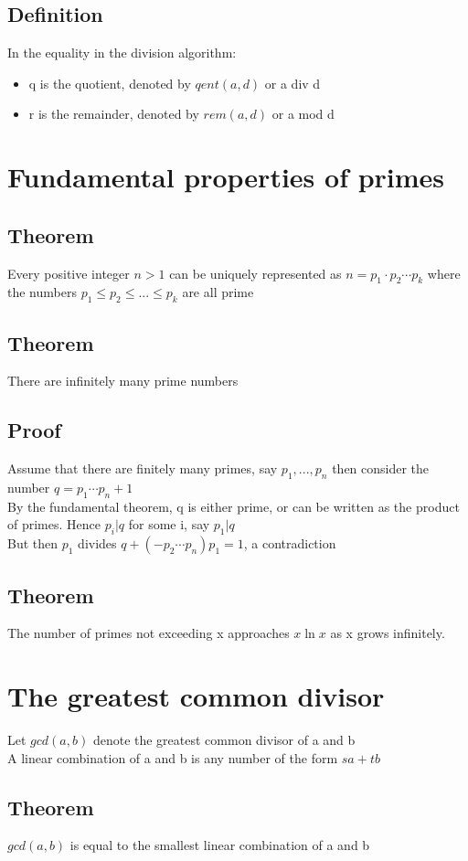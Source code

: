 \documentclass{article}[18pt]
\begin{document}
\subsection{Definition}
In the equality in the division algorithm:
\begin{itemize}
	\item q is the quotient, denoted by $qent(a,d)$ or a div d
	\item r is the remainder, denoted by $rem(a,d)$ or a mod d
\end{itemize}
\section{Fundamental properties of primes}
\subsection{Theorem}
Every positive integer $n>1$ can be uniquely represented as $n=p_1\cdot p_2 \cdots p_k$ where the numbers $p_1\leqslant p_2 \leqslant ... \leqslant p_k$ are all prime
\subsection{Theorem}
There are infinitely many prime numbers
\subsection{Proof}
Assume that there are finitely many primes, say $p_1,...,p_n$ then consider the number $q=p_1 \cdots p_n+1$\\
By the fundamental theorem, q is either prime, or can be written as the product of primes. Hence $p_i|q$ for some i, say $p_1|q$\\
But then $p_1$ divides $q+(-p_2\cdots p_n)p_1=1$, a contradiction
\subsection{Theorem}
The number of primes not exceeding x approaches $x\ln x$ as x grows infinitely.
\section{The greatest common divisor}
Let $gcd(a,b)$ denote the greatest common divisor of a and b\\
A linear combination of a and b is any number of the form $sa+tb$
\subsection{Theorem}
$gcd(a,b)$ is equal to the smallest linear combination of a and b
\end{document}
